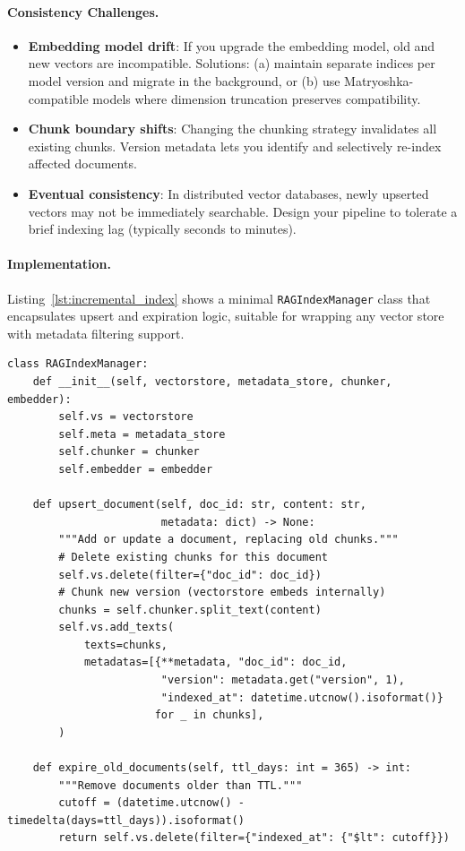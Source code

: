 \paragraph{Consistency Challenges.}
\label{consistency-challenges.}

\begin{itemize}
  \item \textbf{Embedding model drift}: If you upgrade the embedding model, old and new vectors are incompatible. Solutions: (a) maintain separate indices per model version and migrate in the background, or (b) use Matryoshka-compatible models where dimension truncation preserves compatibility.
  \item \textbf{Chunk boundary shifts}: Changing the chunking strategy invalidates all existing chunks. Version metadata lets you identify and selectively re-index affected documents.
  \item \textbf{Eventual consistency}: In distributed vector databases, newly upserted vectors may not be immediately searchable. Design your pipeline to tolerate a brief indexing lag (typically seconds to minutes).
\end{itemize}

\paragraph{Implementation.}
\label{implementation.}

Listing~\ref{lst:incremental_index} shows a minimal \texttt{RAGIndexManager} class that encapsulates upsert and expiration logic, suitable for wrapping any vector store with metadata filtering support.

\begin{lstlisting}[style=pythonstyle, caption={Incremental index updates with versioning}, label={lst:incremental_index}]
class RAGIndexManager:
    def __init__(self, vectorstore, metadata_store, chunker, embedder):
        self.vs = vectorstore
        self.meta = metadata_store
        self.chunker = chunker
        self.embedder = embedder

    def upsert_document(self, doc_id: str, content: str,
                        metadata: dict) -> None:
        """Add or update a document, replacing old chunks."""
        # Delete existing chunks for this document
        self.vs.delete(filter={"doc_id": doc_id})
        # Chunk new version (vectorstore embeds internally)
        chunks = self.chunker.split_text(content)
        self.vs.add_texts(
            texts=chunks,
            metadatas=[{**metadata, "doc_id": doc_id,
                        "version": metadata.get("version", 1),
                        "indexed_at": datetime.utcnow().isoformat()}
                       for _ in chunks],
        )

    def expire_old_documents(self, ttl_days: int = 365) -> int:
        """Remove documents older than TTL."""
        cutoff = (datetime.utcnow() - timedelta(days=ttl_days)).isoformat()
        return self.vs.delete(filter={"indexed_at": {"$lt": cutoff}})
\end{lstlisting}

